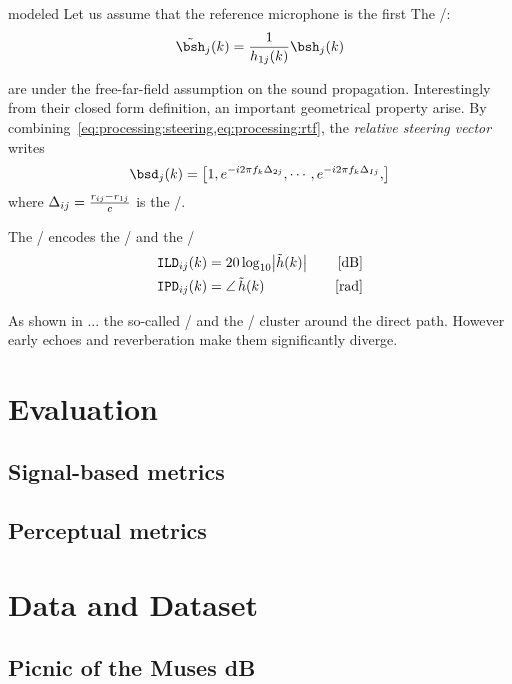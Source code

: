  modeled
Let us assume that the reference microphone is the first
The \RTFdef/:
\begin{equation}\label{eq:processing:rtf}
    \rtfs_j(k) = \frac{1}{\rir_{1j}(k)} \rirs_j(k)
\end{equation}

 are under the free-far-field assumption on the sound propagation.
Interestingly from their closed form definition, an important geometrical property arise.
By combining~\cref{eq:processing:steering,eq:processing:rtf}, the \textit{relative steering vector} writes
\begin{equation}
    \bsd_{j}(k) = \klist{1,
                         \cste^{-\csti 2 \pi f_k \deltaTaus_{2j}},
                         \cdots,
                         \cste^{-\csti 2 \pi f_k \deltaTaus_{Ij}},
                    }
\end{equation}
where $\Delta_{ij} = \frac{r_{ij}-r_{1j}}{c}$ is the \TDOAdef/.

The \RTFs/ encodes the \ILDdef/ and the \IPDdef/
\begin{align}
    \ild_{ij}(k) &= 20 \log_{10} \magnitudeOf{\rtf(k)} \mathspace & [\si{\dB}]\\
    \ipd_{ij}(k) &= \phaseOf{\rtf(k)} \mathspace                  & [\si{\radian}]
\end{align}

As shown in ... the so-called \ILD/ and the \IPD/ cluster around the direct path. However early echoes and
reverberation make them significantly diverge.


\section{Evaluation}\label{sec:evaluation}

\subsection{Signal-based metrics}
\subsection{Perceptual metrics}


\section{Data and Dataset}

\subsection{Picnic of the Muses dB}

\subsection{\dechorate}